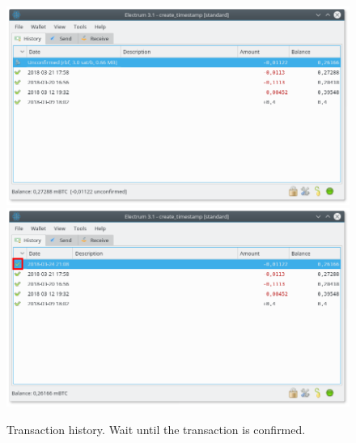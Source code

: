 \begin{figure}
	\begin{center}
		\includegraphics[width=\linewidth]{Images/tx-history.png}
		\includegraphics[width=\linewidth]{Images/tx-history-confirmed.png}
		\caption[Transaction history.]{Transaction history. Wait until the transaction is confirmed.}
		\label{fig:tx-history}
	\end{center}
\end{figure} 

